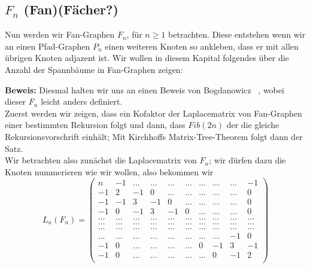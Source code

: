 \subsection{$F_n$ (Fan)(Fächer?)}
Nun werden wir Fan-Graphen $F_n$, für $n \geq 1$ betrachten. Diese entstehen wenn wir an einen Pfad-Graphen $P_{n}$ einen weiteren Knoten so ankleben, dass er mit allen übrigen Knoten adjazent ist. 
Wir wollen in diesem Kapital folgendes über die Anzahl der Spannbäume in Fan-Graphen zeigen:
\begin{Tms}
 \label{ThmFn}
\end{Tms}
\textbf{Beweis:}
Diesmal halten wir uns an einen Beweis von Bogdanowicz ~\cite{bogdanowicz_2008}, wobei dieser $F_n$ leicht anders definiert.\\
Zuerst werden wir zeigen, dass ein Kofaktor der Laplacematrix von Fan-Graphen einer bestimmten Rekursion folgt und dann, dass $Fib(2n)$ der die gleiche Rekursionsvorschrift einhält; Mit Kirchhoffs Matrix-Tree-Theorem folgt dann der Satz.\\
Wir betrachten also zunächst die Laplacematrix von $F_n$; wir dürfen dazu die Knoten nummerieren wie wir wollen, also bekommen wir\\
\begin{equation}
L_n(F_n)=
\begin{pmatrix}
n&-1&\ldots&\ldots&\ldots&\ldots&\ldots&\ldots&\ldots&-1\\
-1&2&-1&0&\ldots&\ldots&\ldots&\ldots&\ldots&0\\
-1&-1&3&-1&0&\ldots&\ldots&\ldots&\ldots&0\\
-1&0&-1&3&-1&0&\ldots&\ldots&\ldots&0\\
\ldots&\ldots&\ldots&\ldots&\ldots&\ldots&\ldots&\ldots&\ldots&\ldots\\
\ldots&\ldots&\ldots&\ldots&\ldots&\ldots&\ldots&\ldots&\ldots&\ldots\\
\ldots&\ldots&\ldots&\ldots&\ldots&\ldots&\ldots&\ldots&\ldots&\ldots\\
\ldots&\ldots&\ldots&\ldots&\ldots&\ldots&\ldots&\ldots&-1&0\\
-1&0&\ldots&\ldots&\ldots&\ldots&0&-1&3&-1\\
-1&0&\ldots&\ldots&\ldots&\ldots&\ldots&0&-1&2\\
\end{pmatrix}
\end{equation}
